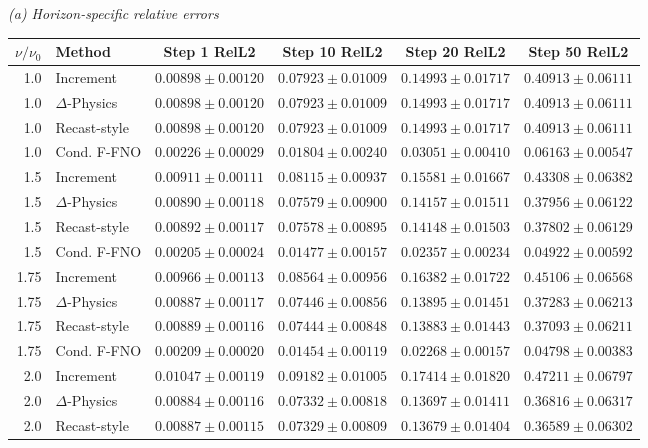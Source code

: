 \begin{table}[!htbp]
\centering
\small
\setlength{\tabcolsep}{4pt}
\renewcommand{\arraystretch}{1.12}
\textit{(a) Horizon-specific relative errors}\par\smallskip
\begin{tabular}{@{}rlcccc@{}}
\toprule
$\nu/\nu_0$ & Method & Step 1 RelL2 & Step 10 RelL2 & Step 20 RelL2 & Step 50 RelL2 \\
\midrule
1.0 & Increment & $0.00898\pm0.00120$ & $0.07923\pm0.01009$ & $0.14993\pm0.01717$ & $0.40913\pm0.06111$ \\
1.0 & $\Delta$-Physics & $0.00898\pm0.00120$ & $0.07923\pm0.01009$ & $0.14993\pm0.01717$ & $0.40913\pm0.06111$ \\
1.0 & Recast-style & $0.00898\pm0.00120$ & $0.07923\pm0.01009$ & $0.14993\pm0.01717$ & $0.40913\pm0.06111$ \\
1.0 & Cond. F-FNO & $0.00226\pm0.00029$ & $0.01804\pm0.00240$ & $0.03051\pm0.00410$ & $0.06163\pm0.00547$ \\
1.5 & Increment & $0.00911\pm0.00111$ & $0.08115\pm0.00937$ & $0.15581\pm0.01667$ & $0.43308\pm0.06382$ \\
1.5 & $\Delta$-Physics & $0.00890\pm0.00118$ & $0.07579\pm0.00900$ & $0.14157\pm0.01511$ & $0.37956\pm0.06122$ \\
1.5 & Recast-style & $0.00892\pm0.00117$ & $0.07578\pm0.00895$ & $0.14148\pm0.01503$ & $0.37802\pm0.06129$ \\
1.5 & Cond. F-FNO & $0.00205\pm0.00024$ & $0.01477\pm0.00157$ & $0.02357\pm0.00234$ & $0.04922\pm0.00592$ \\
1.75 & Increment & $0.00966\pm0.00113$ & $0.08564\pm0.00956$ & $0.16382\pm0.01722$ & $0.45106\pm0.06568$ \\
1.75 & $\Delta$-Physics & $0.00887\pm0.00117$ & $0.07446\pm0.00856$ & $0.13895\pm0.01451$ & $0.37283\pm0.06213$ \\
1.75 & Recast-style & $0.00889\pm0.00116$ & $0.07444\pm0.00848$ & $0.13883\pm0.01443$ & $0.37093\pm0.06211$ \\
1.75 & Cond. F-FNO & $0.00209\pm0.00020$ & $0.01454\pm0.00119$ & $0.02268\pm0.00157$ & $0.04798\pm0.00383$ \\
2.0 & Increment & $0.01047\pm0.00119$ & $0.09182\pm0.01005$ & $0.17414\pm0.01820$ & $0.47211\pm0.06797$ \\
2.0 & $\Delta$-Physics & $0.00884\pm0.00116$ & $0.07332\pm0.00818$ & $0.13697\pm0.01411$ & $0.36816\pm0.06317$ \\
2.0 & Recast-style & $0.00887\pm0.00115$ & $0.07329\pm0.00809$ & $0.13679\pm0.01404$ & $0.36589\pm0.06302$ \\

\end{tabular}
\end{table}
